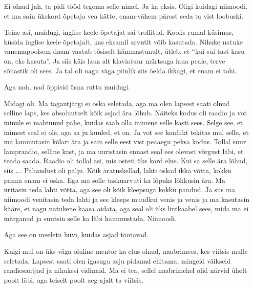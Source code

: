 
Ei olnud jah, ta pidi tööd tegema selle nimel. Ja ka eksis. Oligi kuidagi 
niimoodi, et ma sain ükskord õpetaja vea kätte,  enam-vähem pärast seda ta vist 
loobuski. 

Teine asi, muidugi, inglise keele õpetajat sai trollitud. Koolis rumal küsimus, 
küsida inglise keele õpetajalt, kas eksamil arvutit võib kasutada. Nihuke 
natuke vanemapoolsem daam vaatab tõsiselt hämmastunult, ütleb, et \enquote{kui 
sul tast kasu on, eks kasuta}. Ja siis käis laua alt  klaviatuur mürtsuga laua 
peale,  terve sõnastik oli sees. Ja tal oli nagu väga piinlik siis  öelda 
ikkagi, et enam ei tohi. 

Aga noh, nad õppisid üsna ruttu muidugi.


Midagi oli. Ma tagantjärgi ei oska seletada, aga ma olen lapsest saati olnud 
selline laps, kes absoluutselt kõik asjad ära lõhub. Näiteks kodus oli raadio 
ja vot minule ei mahtunud pähe, kuidas saab olla inimene selle kasti sees. 
Selge see, et inimest seal  ei ole, aga sa ju kuuled, et on. Ja vot see 
konflikt tekitas mul selle, et ma lammutasin kõlari ära ja sain selle eest vist 
peaaegu peksa kodus. Tollal suur lampraadio, selline kast,  ja  ma uuristasin 
ennast  seal ees olevast võrgust läbi, et teada saada. Raadio oli tollal asi, 
mis osteti üks kord elus. Kui sa selle ära lõhud, siis \ldots. Pahandust oli 
palju. Kõik äratuskellad, lahti oskad ikka võtta, kokku panna enam ei oska. Ega 
ma selle taskuarvuti ka lõpuks lõhkusin ära. Ma üritasin teda lahti võtta, aga 
see oli kõik kleepsuga kokku pandud. Ja siis ma niimoodi venitasin teda lahti 
ja see kleeps muudkui venis ja venis ja ma kasutasin kääre, et nagu natukene 
kaasa aidata, aga seal oli üks lintkaabel sees, mida ma ei märganud ja suutsin 
selle ka läbi hammustada. Niimoodi. 

Aga see on meeletu huvi, kuidas asjad töötavad. 

Kuigi mul on üks väga oluline mentor ka elus olnud, naabrimees, kes viitsis 
mulle seletada. Lapsest saati olen igasugu asju pidanud ehitama, mingeid 
väikseid raadiosaatjad ja nihukesi vidinaid. Ma ei tea, sellel naabrimehel olid 
närvid ühelt poolt läbi, aga teiselt poolt aeg-ajalt ta viitsis. 


